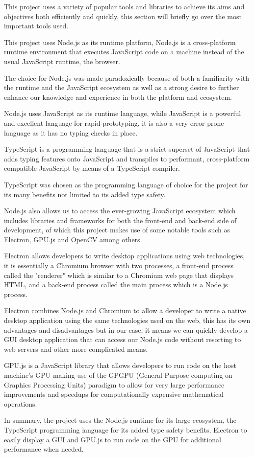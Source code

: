 \documentclass[12pt]{article}
\newcommand{\sentence}{} %
\begin{document}
    \tab
    This project uses a variety of popular tools and libraries to achieve its aims and objectives both efficiently
    and quickly, this section will briefly go over the most important tools used.
    \sentence
    This project uses Node.js as its runtime platform, Node.js is a cross-platform runtime environment that executes
    JavaScript code on a machine instead of the usual JavaScript runtime, the browser.
    \sentence
    The choice for Node.js was made paradoxically because of both a familiarity with the runtime and the JavaScript
    ecosystem as well as a strong desire to further enhance our knowledge and experience in both the platform and
    ecosystem.
    \sentence
    Node.js uses JavaScript as its runtime language, while JavaScript is a powerful and excellent language for
    rapid-prototyping, it is also a very error-prone language as it has no typing checks in place.
    \sentence
    TypeScript is a programming language that is a strict superset of JavaScript that adds typing features onto
    JavaScript and transpiles to performant, cross-platform compatible JavaScript by means of a TypeScript compiler.
    \sentence
    TypeScript was chosen as the programming language of choice for the project for its many benefits not limited to
    its added type safety.
    \sentence

    \bigskip
    \sentence
    Node.js also allows us to access the ever-growing JavaScript ecosystem which includes libraries and
    frameworks for both the front-end and back-end side of development, of which this project makes use of some
    notable tools such as Electron, GPU.js and OpenCV among others.
    \sentence
    Electron allows developers to write desktop applications using web technologies, it is essentially a Chromium
    browser with two processes, a front-end process called the "renderer" which is similar to a Chromium web page
    that displays HTML, and a back-end process called the main process which is a Node.js process.
    \sentence
    Electron combines Node.js and Chromium to allow a developer to write a native desktop application using the same
    technologies used on the web, this has its own advantages and disadvantages but in our case, it means we can
    quickly develop a GUI desktop application that can access our Node.js code without resorting to web servers and
    other more complicated means.
    \sentence
    GPU.js is a JavaScript library that allows developers to run code on the host machine's GPU making use of the
    GPGPU (General-Purpose computing on Graphics Processing Units) paradigm to allow for very large performance
    improvements and speedups for computationally expensive mathematical operations.
    \sentence
    In summary, the project uses the Node.js runtime for its large ecosystem, the TypeScript programming language for
    its added type safety benefits, Electron to easily display a GUI and GPU.js to run code on the GPU for additional
    performance when needed.
    \pagebreak
\end{document}
